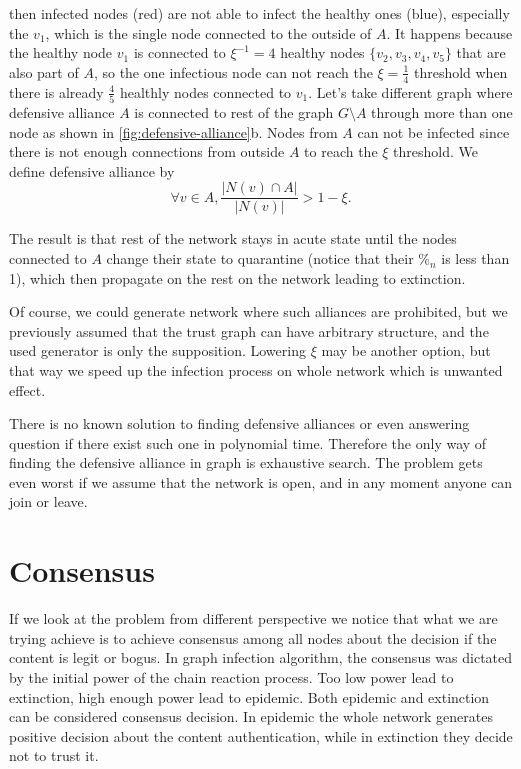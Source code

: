 \documentclass[nostrict]{szablonPG}
\begin{document}
then infected nodes (red) are not able to infect the healthy ones (blue), especially the $v_1$, which is the single node connected to the outside of $A$. It happens because the healthy node $v_1$ is connected to $\xi^{-1} = 4$ healthy nodes $\{v_2,v_3,v_4,v_5\}$ that are also part of $A$, so the one infectious node can not reach the $\xi = \frac{1}{4}$ threshold when there is already $\frac{4}{5}$ healthly nodes connected to $v_1$.
Let's take different graph where defensive alliance $A$ is connected to rest of the graph $G \setminus A$ through more than one node as shown in \ref{fig:defensive-alliance}b. Nodes from $A$ can not be infected since there is not enough connections from outside $A$ to reach the $\xi$ threshold. We define defensive alliance by \[\forall{v \in A}, \frac{|N(v) \cap A|}{|N(v)|} > 1 - \xi.\] 

The result is that rest of the network stays in acute state until the nodes connected to $A$ change their state to quarantine (notice that their $\%_n$ is less than 1), which then propagate on the rest on the network leading to extinction. 

Of course, we could generate network where such alliances are prohibited, but we previously assumed that the trust graph can have arbitrary structure, and the used generator is only the supposition. Lowering $\xi$ may be another option, but that way we speed up the infection process on whole network which is unwanted effect.

There is no known solution to finding defensive alliances or even answering question if there exist such one in polynomial time. Therefore the only way of finding the defensive alliance in graph is exhaustive search. The problem gets even worst if we assume that the network is open, and in any moment anyone can join or leave. 

\section{Consensus}
If we look at the problem from different perspective we notice that what we are trying achieve is to achieve consensus among all nodes about the decision if the content is legit or bogus. In graph infection algorithm, the consensus was dictated by the initial power of the chain reaction process. Too low power lead to extinction, high enough power lead to epidemic. Both epidemic and extinction can be considered consensus decision. In epidemic the whole network generates positive decision about the content authentication, while in extinction they decide not to trust it. 
\end{document}
